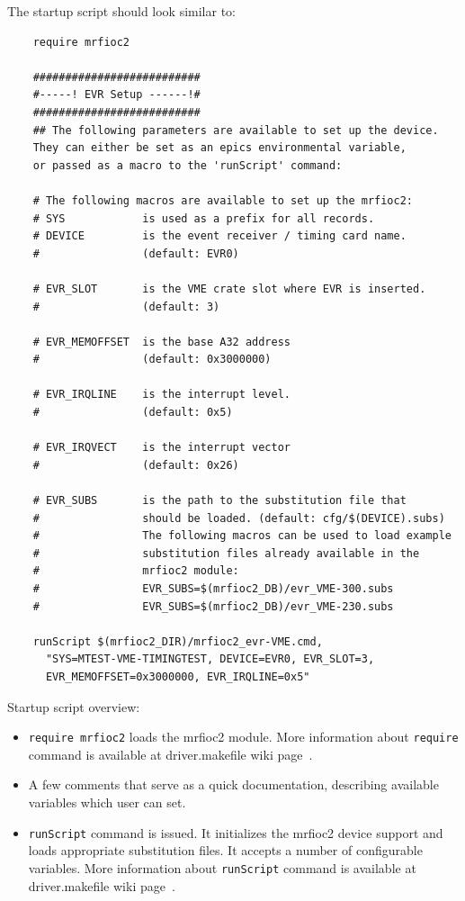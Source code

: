 \documentclass[12pt,a4paper]{article}
\begin{document}
\begin{enumerate}
	The startup script should look similar to:
\begin{verbatim}
	require mrfioc2
	
	##########################
	#-----! EVR Setup ------!#
	##########################
	## The following parameters are available to set up the device. 
	They can either be set as an epics environmental variable, 
	or passed as a macro to the 'runScript' command:
	
	# The following macros are available to set up the mrfioc2:
	# SYS            is used as a prefix for all records.
	# DEVICE         is the event receiver / timing card name. 
	#                (default: EVR0)
	
	# EVR_SLOT       is the VME crate slot where EVR is inserted.
	#                (default: 3)
	
	# EVR_MEMOFFSET	 is the base A32 address 
	#                (default: 0x3000000)
	
	# EVR_IRQLINE    is the interrupt level. 
	#                (default: 0x5)
	
	# EVR_IRQVECT    is the interrupt vector 
	#                (default: 0x26)
	
	# EVR_SUBS       is the path to the substitution file that
	#                should be loaded. (default: cfg/$(DEVICE).subs)
	#                The following macros can be used to load example 
	#                substitution files already available in the 
	#                mrfioc2 module:
	#                EVR_SUBS=$(mrfioc2_DB)/evr_VME-300.subs
	#                EVR_SUBS=$(mrfioc2_DB)/evr_VME-230.subs
	
	runScript $(mrfioc2_DIR)/mrfioc2_evr-VME.cmd, 
	  "SYS=MTEST-VME-TIMINGTEST, DEVICE=EVR0, EVR_SLOT=3, 
	  EVR_MEMOFFSET=0x3000000, EVR_IRQLINE=0x5"

\end{verbatim}
Startup script overview:
\begin{itemize}
\item 
	\texttt{require mrfioc2} loads the mrfioc2 module. More information about \texttt{require} command is available at driver.makefile wiki page~\cite{driver.makefile}.
\item 
	A few comments that serve as a quick documentation, describing available variables which user can set.
\item 
	\texttt{runScript} command is issued. It initializes the mrfioc2 device support and loads appropriate substitution files. It accepts a number of configurable variables. More information about \texttt{runScript} command is available at driver.makefile wiki page~\cite{driver.makefile}.
\end{itemize}


\end{enumerate}
\end{document}
